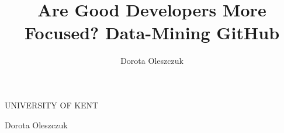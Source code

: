 \author{Dorota Oleszczuk}
\title{Are Good Developers More Focused? Data-Mining GitHub}

\begin{titlepage}
  \centering



  \vspace{5mm}
  {\large\MakeUppercase{University of Kent}}\\

  \vspace{20mm}

  \makeatletter
  \vspace{15mm}
  {
  {\huge\bfseries \@title}

  \vspace{10mm}
  }
  \makeatother

  \vspace{15mm}
  {\large{Dorota Oleszczuk}}\\

\end{titlepage}
